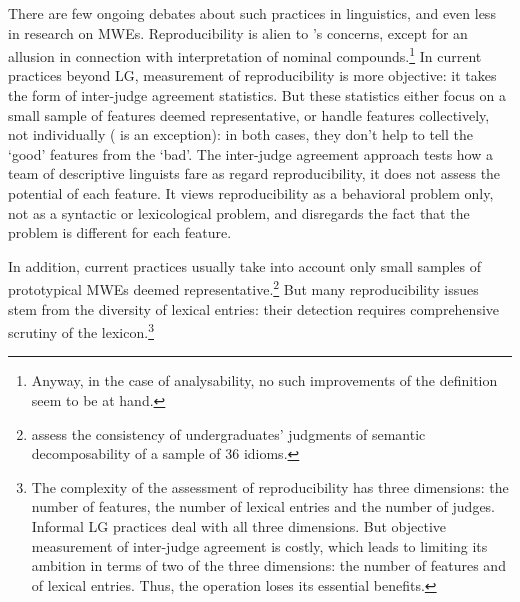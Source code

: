 \documentclass[output=paper]{langsci/langscibook}
\begin{document}
There are few ongoing debates about such practices in linguistics, and even less in research on MWEs. Reproducibility is alien to \cite[275]{Baldwin2010}'s concerns, except for an allusion in connection with interpretation of nominal compounds.\footnote{ Anyway, in the case of analysability, no such improvements of the definition seem to be at hand.} In current practices beyond LG, measurement of reproducibility is more objective: it takes the form of inter-judge agreement statistics. But these statistics either focus on a small sample of features deemed representative, or handle features collectively, not individually (\citealt[86]{Palmer} is an exception): in both cases, they don’t help to tell the ‘good’ features from the ‘bad’. The inter-judge agreement approach tests how a team of descriptive linguists fare as regard reproducibility, it does not assess the potential of each feature. It views reproducibility as a behavioral problem only, not as a syntactic or lexicological problem, and disregards the fact that the problem is different for each feature.

In addition, current practices usually take into account only small samples of prototypical MWEs deemed representative.\footnote{\cite[60]{Gibbs1989a}  assess the consistency of undergraduates’ judgments of semantic decomposability of a sample of 36 idioms.} But many reproducibility issues stem from the diversity of lexical entries: their detection requires comprehensive scrutiny of the lexicon.\footnote{ The complexity of the assessment of reproducibility has three dimensions: the number of features, the number of lexical entries and the number of judges. Informal LG practices deal with all three dimensions. But objective measurement of inter-judge agreement is costly, which leads to limiting its ambition in terms of two of the three dimensions: the number of features and of lexical entries. Thus, the operation loses its essential benefits.}
\end{document}
